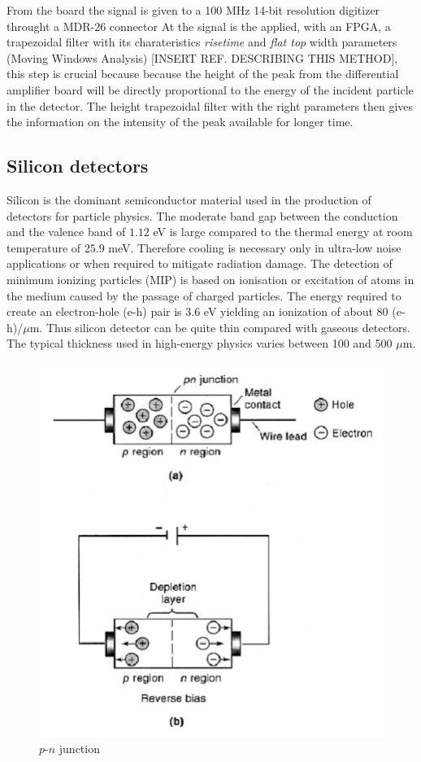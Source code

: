 From the board the signal is given to a 100 MHz 14-bit resolution digitizer throught a MDR-26 connector
At the signal is the applied, with an FPGA, a trapezoidal filter with its charateristics \emph{risetime} and \emph{flat top} width parameters (Moving Windows Analysis) [INSERT REF. DESCRIBING THIS METHOD], this step is crucial because because the height of the peak from the differential amplifier board will be directly proportional to the energy of the incident particle in the detector.
The height trapezoidal filter with the right parameters then gives the information on the intensity of the peak available for longer time.

\subsection{Silicon detectors}

Silicon is the dominant semiconductor material used in the production of
detectors for particle physics. The moderate band gap between the conduction
and the valence band of $1.12$ eV is large compared to the thermal
energy at room temperature of $25.9$ meV. Therefore cooling is necessary
only in ultra-low noise applications or when required to mitigate radiation
damage. The detection of minimum ionizing particles (MIP) is based on
ionisation or excitation of atoms in the medium caused by the passage of
charged particles. The energy required to create an electron-hole (e-h) pair
is $3.6$ eV yielding an ionization of about 80 (e-h)/$\mu$m. Thus silicon
detector can be quite thin compared with gaseous detectors. The typical
thickness used in high-energy physics varies between 100 and 500 $\mu$m.

\bigbreak

\begin{figure}[h]
  \centering
  \includegraphics[scale=.25]{img/depletion.png}
  \caption{$p$-$n$ junction}
  \label{chain}
\end{figure}

